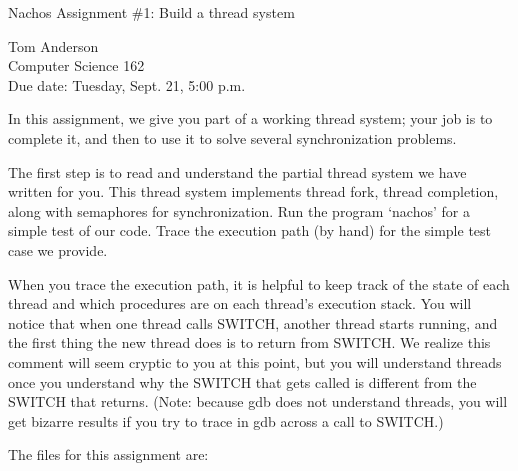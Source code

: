 


\begin{center}
{\large Nachos Assignment \#1: Build a thread system

\vspace{.2in}
Tom Anderson\\
Computer Science 162\\
Due date: Tuesday, Sept. 21, 5:00 p.m.
}
\end{center}

\vspace{.2in}

In this assignment, we give you part of a working thread system; 
your job is to complete it, and then to use it to solve
several synchronization problems.  

The first step is to read and understand the partial thread system 
we have written for you.  This thread system implements thread fork, 
thread completion, along with semaphores for synchronization.  
Run the program `nachos' for a simple test of our code.
Trace the execution path (by hand) for the simple test case
we provide.

When you trace the execution path, it is helpful to keep track
of the state of each thread and which procedures are on each thread's 
execution stack.
You will notice that when one thread calls SWITCH, another thread
starts running, and the first thing the new thread does is 
to return from SWITCH.
We realize this comment will seem cryptic to you at this point, but you
will understand threads once you understand
why the SWITCH that gets called is different from the SWITCH that returns.
(Note: because gdb does not understand threads, you will get bizarre 
results if you try to trace in gdb across a call to SWITCH.)

The files for this assignment are:

